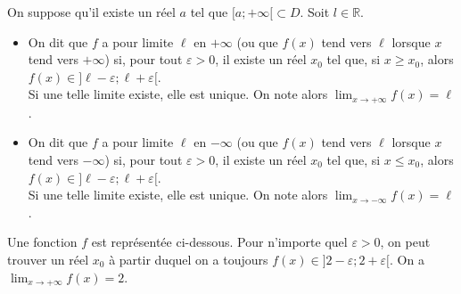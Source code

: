 \documentclass[11pt,fleqn, openany]{book} %
\begin{document}
\begin{definition}On suppose qu'il existe un réel $a$ tel que $[a;+\infty [ \subset D$. Soit $l\in\mathbb{R}$.
\begin{itemize}
\item On dit que $f$ a pour limite $\ell$ en $+\infty$ (ou que $f(x)$ tend vers $\ell$ lorsque $x$ tend vers $+\infty$) si, pour tout $\varepsilon>0$, il existe un réel $x_0$ tel que, si $x \geqslant x_0$, alors $f(x) \in ]\ell-\varepsilon ; \ell+\varepsilon [$.\\ Si une telle limite existe, elle est unique. On note alors $\displaystyle \lim_{x \to +\infty} f(x)=\ell$.
\item On dit que $f$ a pour limite $\ell$ en $-\infty$ (ou que $f(x)$ tend vers $\ell$ lorsque $x$ tend vers $-\infty$) si, pour tout $\varepsilon>0$, il existe un réel $x_0$ tel que, si $x \leqslant x_0$, alors $f(x) \in ]\ell-\varepsilon ; \ell+\varepsilon [$.\\ Si une telle limite existe, elle est unique. On note alors $\displaystyle \lim_{x \to -\infty} f(x)=\ell$.
\end{itemize}\end{definition}

\begin{example} Une fonction $f$ est représentée ci-dessous. Pour n'importe quel $\varepsilon>0$, on peut trouver un réel $x_0$ à partir duquel on a toujours $f(x) \in ]2-\varepsilon ; 2+\varepsilon [$. On a  $\displaystyle \lim_{x \to +\infty} f(x)=2$.

\begin{center}

\end{center}\end{example}
\end{document}
